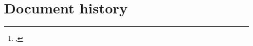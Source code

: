 \documentclass[a4paper,twoside,twocolumn]{article}
\title{\metatitle}%
\author{\metaauthori%
\thanks{\metamaili, %
\metaaddress}%
}
\date{\metadate}%
\newif\ifccs   %
\newcommand*{\metakeywords}{Data Communication, Networks, Internet, Control, Congestion Control, Quality of Service, Performance, Latency, Responsiveness, Dynamics, Algorithm, Active Queue Management, AQM, Congestion Signalling, Sojourn time, Queue delay, Service time, Wait time, Expectation, Estimation, Blame, Fair marking, Burstiness, Cost-fairness, Explicit Congestion Notification, ECN, Packet Drop, Discard}
\begin{document}
%


\maketitle%
\thispagestyle{first}

\begin{abstract}
{\small\noindent%
}      %
\end{abstract}
\ifccs{}%
%
%
\subsection*{CCS Concepts}
\textbf{\textbullet Networks} \(\to\) \textbf{Cross-layer protocols; Network algorithms; Network dynamics;}
\subsubsection*{Keywords}
\metakeywords
%
\fi{}%


{}

{\footnotesize%
}

\clearpage
\appendix

\onecolumn%
\section*{Document history}
\end{document}
